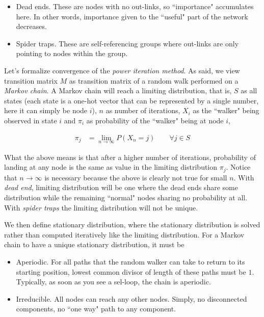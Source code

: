 \begin{itemize}
    \item Dead ends. These are nodes with no out-links, so ``importance" accumulates here. In other words, importance given to the ``useful" part of the network decreases.
    
    \item Spider traps. These are self-referencing groups where out-links are only pointing to nodes within the group. 
\end{itemize}{} 

Let's formalize convergence of the \textit{power iteration method}. As said, we view transition matrix $M$ as transition matrix of a random walk performed on a \textit{Markov chain}. A Markov chain will reach a limiting distribution, that is, $S$ as all states (each state is a one-hot vector that can be represented by a single number, here it can simply be node $i$), $n$ as number of iterations, $X_i$ as the ``walker" being observed in state $i$ and $\pi_i$ as probability of the ``walker" being at node $i$,

\begin{align}
    \pi_j &= \lim_{n \rightarrow \infty} P(X_n = j) \qquad \forall j \in S
\end{align}{}

What the above means is that after a higher number of iterations, probability of landing at any node is the same as value in the limiting distribution $\pi_j$. Notice that $n\rightarrow \infty$ is necessary because the above is clearly not true for small $n$. With \textit{dead end}, limiting distribution will be one where the dead ends share some distribution while the remaining ``normal" nodes sharing no probability at all. With \textit{spider traps} the limiting distribution will not be unique. 

We then define stationary distribution, where the stationary distribution is solved rather than computed iteratively like the limiting distribution. For a Markov chain to have a unique stationary distribution, it must be 

\begin{itemize}
    \item Aperiodic. For all paths that the random walker can take to return to its starting position, lowest common divisor of length of these paths must be $1$. Typically, as soon as you see a sel-loop, the chain is aperiodic. 
    
    \item Irreducible. All nodes can reach any other nodes. Simply, no disconnected components, no ``one way" path to any component.
\end{itemize}{}

